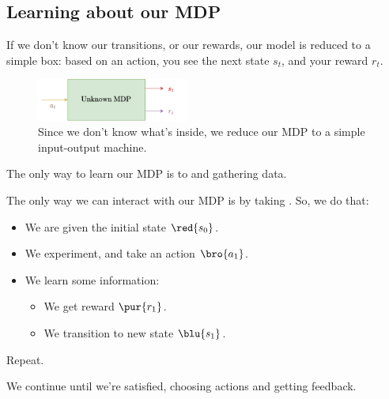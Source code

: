     \phantom{}

    \subsection{Learning about our MDP}

        If we don't know our transitions, or our rewards, our model is reduced to a simple box: based on an action, you see the next state $s_t$, and your reward $r_t$.

        \begin{figure}[H]
            \centering
            \includegraphics[width=50mm,scale=0.5]{images/rl_images/mdp_blackbox.png}
            \caption*{Since we don't know what's inside, we reduce our MDP to a simple input-output machine.}
        \end{figure}
        
        
        The only way to learn our MDP is to  and gathering data.

        The only way we can interact with our MDP is by taking . So, we do that:

        \begin{itemize}
            \item We are given the initial state $\red{s_0}$.
            \item We experiment, and take an action $\bro{a_1}$.
            \item We learn some information:
                \begin{itemize}
                    \item We get reward $\pur{r_1}$.
                    \item We transition to new state $\blu{s_1}$.
                \end{itemize}
        \end{itemize}

        Repeat.

        \subsecdiv

        We continue until we're satisfied, choosing actions and getting feedback.\\

